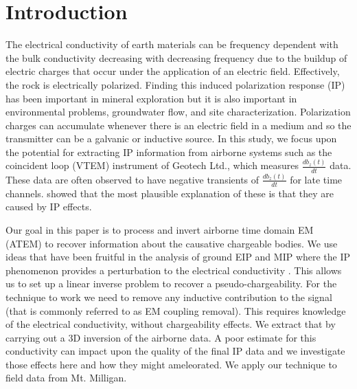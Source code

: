 \documentclass{segabs}
\begin{document}
\section{Introduction}
The electrical conductivity of earth materials can be frequency dependent with the bulk conductivity decreasing with decreasing frequency due to the buildup of electric charges that occur under the application of an electric field. Effectively, the rock is electrically polarized. Finding this induced polarization response (IP) has been important in mineral exploration but it is also important in   environmental problems, groundwater flow, and site characterization. Polarization charges can accumulate whenever there is an electric field in a medium and so the transmitter can be a galvanic or inductive source. In this study, we focus upon the potential for extracting IP information from airborne systems such as the coincident loop (VTEM) instrument of Geotech Ltd., which measures $\frac{db_z(t)}{dt}$ data. These data are often observed to have negative transients of $\frac{db_z(t)}{dt}$ for late time channels. \cite{Weidelt1982} showed that the most plausible explanation of these is that they are caused by IP effects.

Our goal in this paper is to process and invert airborne time domain EM (ATEM) to recover information about the causative chargeable bodies. We use ideas that have been fruitful in the analysis of ground EIP and MIP where the IP phenomenon provides a perturbation to the electrical conductivity \cite[]{seigel1959,seigel1974}. This allows us to set up a linear inverse problem to recover a pseudo-chargeability. For the technique to work we need to remove any inductive contribution to the signal (that is commonly referred to as EM coupling removal). This requires knowledge of the electrical conductivity, without chargeability effects. We extract that by carrying out a 3D inversion of the airborne data. A poor estimate for this conductivity can impact upon the quality of the final IP data and we investigate those effects here and how they might ameleorated. We apply our technique to field data from Mt. Milligan.

\end{document}
